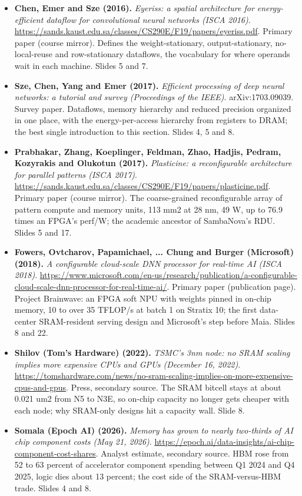 \documentclass[11pt,letterpaper]{article}
\begin{document}
\begin{itemize}[leftmargin=1.2em,itemsep=3pt]
\item \textbf{Chen, Emer and Sze (2016).} \textit{Eyeriss: a spatial architecture for energy-efficient dataflow for convolutional neural networks (ISCA 2016)}. \url{https://sands.kaust.edu.sa/classes/CS290E/F19/papers/eyeriss.pdf}. Primary paper (course mirror). Defines the weight-stationary, output-stationary, no-local-reuse and row-stationary dataflows, the vocabulary for where operands wait in each machine. Slides 5 and 7.
\item \textbf{Sze, Chen, Yang and Emer (2017).} \textit{Efficient processing of deep neural networks: a tutorial and survey (Proceedings of the IEEE)}. arXiv:1703.09039. Survey paper. Dataflows, memory hierarchy and reduced precision organized in one place, with the energy-per-access hierarchy from registers to DRAM; the best single introduction to this section. Slides 4, 5 and 8.
\item \textbf{Prabhakar, Zhang, Koeplinger, Feldman, Zhao, Hadjis, Pedram, Kozyrakis and Olukotun (2017).} \textit{Plasticine: a reconfigurable architecture for parallel patterns (ISCA 2017)}. \url{https://sands.kaust.edu.sa/classes/CS290E/F19/papers/plasticine.pdf}. Primary paper (course mirror). The coarse-grained reconfigurable array of pattern compute and memory units, 113 mm2 at 28 nm, 49 W, up to 76.9 times an FPGA's perf/W; the academic ancestor of SambaNova's RDU. Slides 5 and 17.
\item \textbf{Fowers, Ovtcharov, Papamichael, ... Chung and Burger (Microsoft) (2018).} \textit{A configurable cloud-scale DNN processor for real-time AI (ISCA 2018)}. \url{https://www.microsoft.com/en-us/research/publication/a-configurable-cloud-scale-dnn-processor-for-real-time-ai/}. Primary paper (publication page). Project Brainwave: an FPGA soft NPU with weights pinned in on-chip memory, 10 to over 35 TFLOP/s at batch 1 on Stratix 10; the first data-center SRAM-resident serving design and Microsoft's step before Maia. Slides 8 and 22.
\item \textbf{Shilov (Tom's Hardware) (2022).} \textit{TSMC's 3nm node: no SRAM scaling implies more expensive CPUs and GPUs (December 16, 2022)}. \url{https://tomshardware.com/news/no-sram-scaling-implies-on-more-expensive-cpus-and-gpus}. Press, secondary source. The SRAM bitcell stays at about 0.021 um2 from N5 to N3E, so on-chip capacity no longer gets cheaper with each node; why SRAM-only designs hit a capacity wall. Slide 8.
\item \textbf{Somala (Epoch AI) (2026).} \textit{Memory has grown to nearly two-thirds of AI chip component costs (May 21, 2026)}. \url{https://epoch.ai/data-insights/ai-chip-component-cost-shares}. Analyst estimate, secondary source. HBM rose from 52 to 63 percent of accelerator component spending between Q1 2024 and Q4 2025, logic dies about 13 percent; the cost side of the SRAM-versus-HBM trade. Slides 4 and 8.
\end{itemize}
\end{document}
